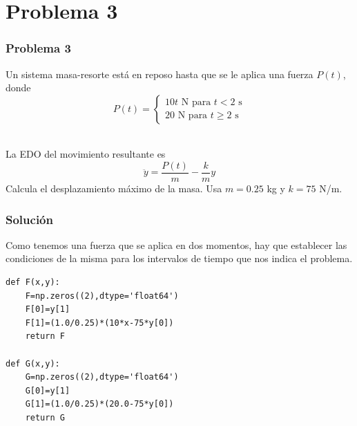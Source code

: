 \section{Problema 3}
\begin{frame}
\frametitle{Problema 3}
Un sistema masa-resorte está en reposo hasta que se le aplica una fuerza $P(t)$, donde
\[ P(t) = \begin{cases}
10 t \mbox{ N para } t < 2 \mbox{ s} \\
20 \mbox{ N para } t \geq 2 \mbox{ s}
\end{cases} \]
\\
\begin{center}
\end{center}
La EDO del movimiento resultante es
\[  \ddot{y} = \dfrac{P(t)}{m} - \dfrac{k}{m} y\]
Calcula el desplazamiento máximo de la masa. Usa $m=0.25$ kg y $k=75$ N/m.
\end{frame}
\begin{frame}[fragile]
\frametitle{Solución}
Como tenemos una fuerza que se aplica en dos momentos, hay que establecer las condiciones de la misma para los intervalos de tiempo que nos indica el problema.
\begin{lstlisting}
def F(x,y):
    F=np.zeros((2),dtype='float64')
    F[0]=y[1]
    F[1]=(1.0/0.25)*(10*x-75*y[0])
    return F

def G(x,y):
    G=np.zeros((2),dtype='float64')
    G[0]=y[1]
    G[1]=(1.0/0.25)*(20.0-75*y[0])
    return G
\end{lstlisting}
\end{frame}

